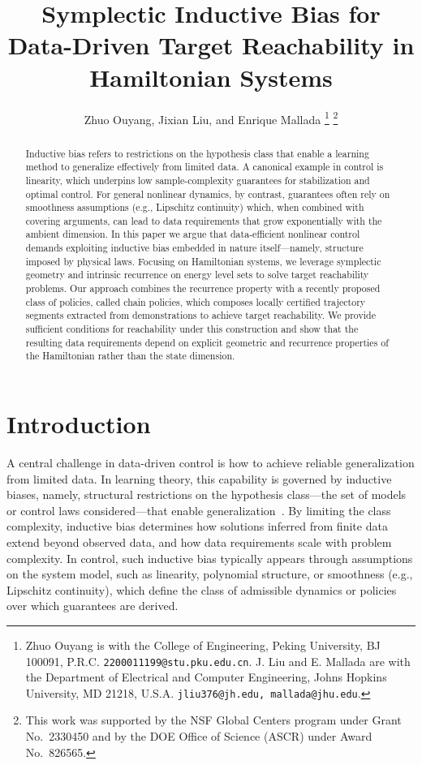 \documentclass[letterpaper, 10 pt, conference]{ieeeconf}
\title{\LARGE \bf 
Symplectic Inductive Bias for Data-Driven Target Reachability in Hamiltonian Systems
}
\author{Zhuo Ouyang, Jixian Liu, and Enrique Mallada
\thanks{Zhuo Ouyang is with the College of Engineering, Peking University, BJ 100091, P.R.C. {\tt\small 2200011199@stu.pku.edu.cn}. J. Liu and E. Mallada are with the Department of Electrical and Computer Engineering, Johns Hopkins University, MD 21218, U.S.A. 
        {\tt\small jliu376@jh.edu, mallada@jhu.edu}.}
\thanks{This work was supported by the NSF Global Centers program under Grant No.~2330450 and by the DOE Office of Science (ASCR) under Award No.~826565.
}}
\begin{document}
\maketitle
\thispagestyle{empty}
\pagestyle{empty}

\maketitle
\thispagestyle{empty}
\pagestyle{empty}

\begin{abstract}
Inductive bias refers to restrictions on the hypothesis class that enable a learning method to generalize effectively from limited data. A canonical example in control is linearity, which underpins low sample-complexity guarantees for stabilization and optimal control. For general nonlinear dynamics, by contrast, guarantees often rely on smoothness assumptions (e.g., Lipschitz continuity) which, when combined with covering arguments, can lead to data requirements that grow exponentially with the ambient dimension. In this paper we argue that data-efficient nonlinear control demands exploiting inductive bias embedded in nature itself—namely, structure imposed by physical laws. Focusing on Hamiltonian systems, we leverage symplectic geometry and intrinsic recurrence on energy level sets to solve target reachability problems. Our approach combines the recurrence property with a recently proposed class of policies, called chain policies, which composes locally certified trajectory segments extracted from demonstrations to achieve target reachability. We provide sufficient conditions for reachability under this construction and show that the resulting data requirements depend on explicit geometric and recurrence properties of the Hamiltonian rather than the state dimension.
\end{abstract}
\section{Introduction} \label{sec:intro}

A central challenge in data-driven control is how to achieve reliable generalization from limited data. In learning theory, this capability is governed by inductive biases, namely, structural restrictions on the hypothesis class—the set of models or control laws considered—that enable generalization~\cite{vapnik1998statistical,shalev2014understanding,bishop2006pattern}. By limiting the class complexity, inductive bias determines how solutions inferred from finite data extend beyond observed data, and how data requirements scale with problem complexity. In control, such inductive bias typically appears through assumptions on the system model, such as linearity, polynomial structure, or smoothness (e.g., Lipschitz continuity), which define the class of admissible dynamics or policies over which guarantees are derived.
\end{document}
